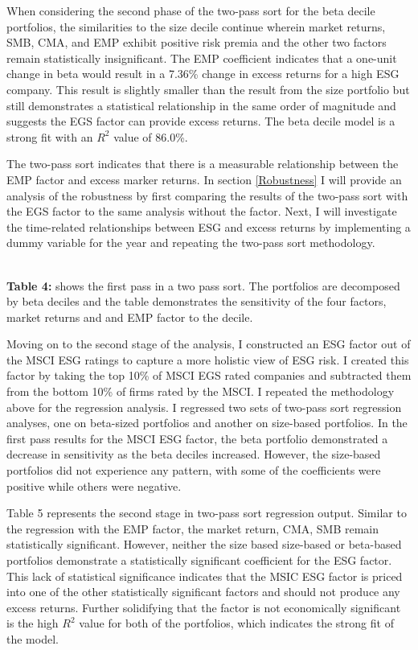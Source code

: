 When considering the second phase of the two-pass sort for the beta decile portfolios, the similarities to the size decile continue wherein market returns, SMB, CMA, and EMP exhibit positive risk premia and the other two factors remain statistically insignificant. The EMP coefficient indicates that a one-unit change in beta would result in a 7.36\% change in excess returns for a high ESG company. This result is slightly smaller than the result from the size portfolio but still demonstrates a statistical relationship in the same order of magnitude and suggests the EGS factor can provide excess returns. The beta decile model is a strong fit with an $R^2$ value of 86.0\%.  

The two-pass sort indicates that there is a measurable relationship between the EMP factor and excess marker returns. In section \ref{Robustness} I will provide an analysis of the robustness by first comparing the results of the two-pass sort with the EGS factor to the same analysis without the factor. Next, I will investigate the time-related relationships between ESG and excess returns by implementing a dummy variable for the year and repeating the two-pass sort methodology.

\begin{center}
    \paperspacingnarrow
    \\
    \textbf{Table 4:} shows the first pass in a two pass sort. The portfolios are decomposed by beta deciles and the table demonstrates the sensitivity of the four factors, market returns and and EMP factor to the decile.\\
    \paperspacingwide
\end{center}

Moving on to the second stage of the analysis, I constructed an ESG factor out of the MSCI ESG ratings to capture a more holistic view of ESG risk. I created this factor by taking the top 10\% of MSCI EGS rated companies and subtracted them from the bottom 10\% of firms rated by the MSCI. I repeated the methodology above for the regression analysis. I  regressed two sets of two-pass sort  regression analyses, one on beta-sized portfolios and another on size-based portfolios. In the first pass results for the MSCI ESG factor, the beta portfolio demonstrated a decrease in sensitivity as the beta deciles increased. However, the size-based portfolios did not experience any pattern, with some of the coefficients were positive while others were negative. 

Table 5 represents the second stage in two-pass sort regression output. Similar to the regression with the EMP factor, the market return, CMA, SMB remain statistically significant. However, neither the size based size-based or beta-based portfolios demonstrate a statistically significant coefficient for the ESG factor. This lack of statistical significance indicates that the MSIC ESG factor is priced into one of the other statistically significant factors and should not produce any excess returns. Further solidifying that the factor is not economically significant is the high $R^2$  value for both of the portfolios, which indicates the strong fit of the model. 

